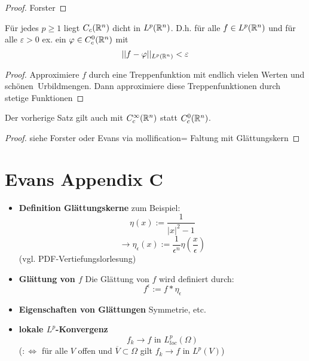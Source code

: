 \begin{proof}
	Forster
\end{proof}

\begin{satz} \enter
	Für jedes $p \geq 1$ liegt $C_c(\mathbb{R}^n)$ dicht in $L^p(\mathbb{R}^n)$. \enter
	D.h. für alle $f \in L^p(\mathbb{R}^n)$ und für alle $\varepsilon > 0$ ex. ein
	$\varphi \in C^0_c(\mathbb{R}^n)$ mit 
	\[||f-\varphi||_{ L^p(\mathbb{R}^n)} < \varepsilon\]
\end{satz}

\begin{proof}
	Approximiere $f$ durch eine Treppenfunktion mit endlich vielen Werten und \glqq sch\"onen\grqq\ Urbildmengen. Dann approximiere diese Treppenfunktionen durch stetige Funktionen
\end{proof}

\begin{satz}\enter
	Der vorherige Satz gilt auch mit $C^\infty_c(\mathbb{R}^n)$ statt $C^0_c(\mathbb{R}^n)$.
\end{satz}

\begin{proof}
	siehe Forster oder Evans via \glqq mollification\grqq = Faltung mit Glättungskern
\end{proof}


\section{Evans Appendix C}

\begin{itemize}
	\item \textbf{Definition Glättungskerne} \enter
		zum Beispiel:
		\[\eta(x):= \frac{1}{|x|^2-1}\]
		\[\rightarrow \eta_\epsilon(x):=\frac{1}{\epsilon^n}\eta\left(\frac{x}{\epsilon}\right)\]
			(vgl. PDF-Vertiefungslorlesung)
		\item \textbf{Glättung von $f$} \enter
			Die Glättung von $f$ wird definiert durch:
			\[f^\epsilon:=f\ast\eta_\epsilon\]
		\item \textbf{Eigenschaften von Glättungen}\enter
			Symmetrie, etc.
		\item \textbf{lokale $L^p$-Konvergenz}\enter
			\[f_k \rightarrow f \text{ in } L^p_{loc}(\Omega)\]
			($:\iff$ für alle $V$ offen und $\overline{V}\subset\Omega$ gilt
				$f_k\rightarrow f \text{ in } L^p(V)$)
\end{itemize}
